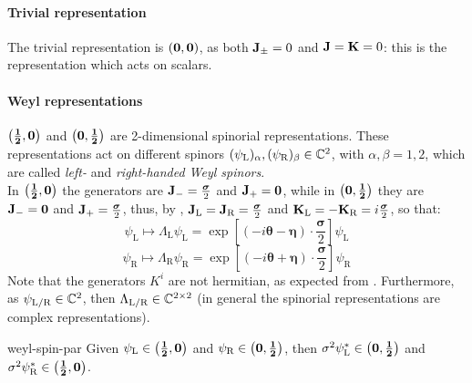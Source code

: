 \paragraph{Trivial representation}

The trivial representation is $ \mathbf{\left( 0,0 \right)} $, as both $ \mathbf{J}_{\pm} = 0 $ and $ \mathbf{J} = \mathbf{K} = 0 $: this is the representation which acts on scalars.

\paragraph{Weyl representations}

$ \mathbf{\left( \frac{1}{2},0 \right)} $ and $ \mathbf{\left( 0,\frac{1}{2} \right)} $ are 2-dimensional spinorial representations. These representations act on different spinors $ (\psi_\text{L})_\alpha , (\psi_\text{R})_\beta \in \mathbb{C}^2 $, with $ \alpha,\beta = 1,2 $, which are called \textit{left-} and \textit{right-handed  Weyl spinors}.\\
In $ \mathbf{\left( \frac{1}{2},0 \right)} $ the generators are $ \mathbf{J}_- = \frac{\boldsymbol{\sigma}}{2} $ and $ \mathbf{J}_+ = \mathbf{0} $, while in $ \mathbf{\left( 0,\frac{1}{2} \right)} $ they are $ \mathbf{J}_- = \mathbf{0} $ and $ \mathbf{J}_+ = \frac{\boldsymbol{\sigma}}{2} $, thus, by , $ \mathbf{J}_\text{L} = \mathbf{J}_\text{R} = \frac{\boldsymbol{\sigma}}{2} $ and $ \mathbf{K}_\text{L} = - \mathbf{K}_\text{R} = i \frac{\boldsymbol{\sigma}}{2} $, so that:
\begin{equation}
  \psi_\text{L} \mapsto \Lambda_\text{L} \psi_\text{L} = \exp \left[ \left( -i \boldsymbol{\theta} - \boldsymbol{\eta} \right) \cdot \frac{\boldsymbol{\sigma}}{2} \right] \psi_\text{L}
  \label{eq:lor-left-hand-weyl}
\end{equation}
\begin{equation}
  \psi_\text{R} \mapsto \Lambda_\text{R} \psi_\text{R} = \exp \left[ \left( -i \boldsymbol{\theta} + \boldsymbol{\eta} \right) \cdot \frac{\boldsymbol{\sigma}}{2} \right] \psi_\text{R}
  \label{eq:lor-right-hand-weyl}
\end{equation}
Note that the generators $ K^i $ are not hermitian, as expected from . Furthermore, as $ \psi_{\text{L}/\text{R}} \in \mathbb{C}^2 $, then $ \Lambda_{\text{L}/\text{R}} \in \mathbb{C}^{2 \times 2} $ (in general the spinorial representations are complex representations).

\begin{proposition}{}{weyl-spin-par}
  Given $ \psi_\text{L} \in \mathbf{\left( \frac{1}{2},0 \right)} $ and $ \psi_\text{R} \in \mathbf{\left( 0,\frac{1}{2} \right)} $, then $ \sigma^2 \psi_\text{L}^* \in \mathbf{\left( 0,\frac{1}{2} \right)} $ and $ \sigma^2 \psi_\text{R}^* \in \mathbf{\left( \frac{1}{2},0 \right)} $.
\end{proposition}

